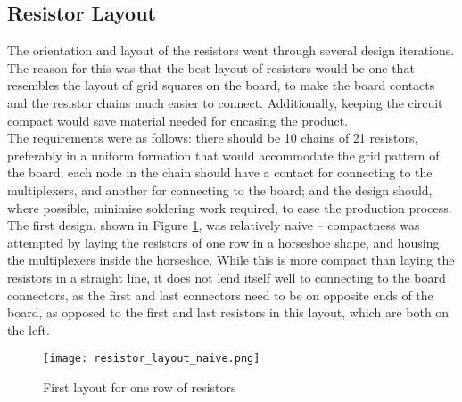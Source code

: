 \subsection {Resistor Layout}

The orientation and layout of the resistors went through several design iterations. The reason for this was that the best layout of resistors would be one that resembles the layout of grid squares on the board, to make the board contacts and the resistor chains much easier to connect. Additionally, keeping the circuit compact would save material needed for encasing  the product. \\

The requirements were as follows: there should be 10 chains of 21 resistors, preferably in a uniform formation that would accommodate the grid pattern of the board; each node in the chain should have a contact for connecting to the multiplexers, and another for connecting to the board; and the design should, where possible, minimise soldering work required, to ease the production process.\\

The first design, shown in Figure \ref{fig:resistor_layout_naive},  was relatively naive -- compactness was attempted by laying the resistors of one row in a horseshoe shape, and housing the multiplexers inside the horseshoe. While this is more compact than laying the resistors in a straight line, it does not lend itself well to connecting to the board connectors, as the first and last connectors need to be on opposite ends of the board, as opposed to the first and last resistors in this layout, which are both on the left.\\


\begin{figure}[H]
	\begin{center}
	\texttt{[image: resistor\_layout\_naive.png]}\\ 
  	\caption{First layout for one row of resistors}
    \label{fig:resistor_layout_naive}
    \end{center}
\end{figure}


